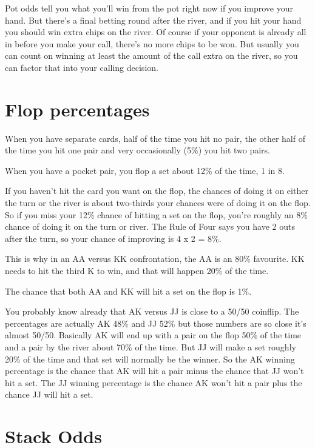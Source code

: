 Pot odds tell you what you'll win from the pot right now if you
improve your hand. But there's a final betting round after the river,
and if you hit your hand you should win extra chips on the river. Of
course if your opponent is already all in before you make your call,
there's no more chips to be won. But usually you can count on winning
at least the amount of the call extra on the river, so you can factor
that into your calling decision.

\section{Flop percentages}

When you have separate cards, half of the time you hit no pair, the
other half of the time you hit one pair and very occasionally (5\%)
you hit two pairs.

When you have a pocket pair, you flop a set about 12\% of the time, 1
in 8.

If you haven't hit the card you want on the flop, the chances of doing
it on either the turn or the river is about two-thirds your
chances were of doing it on the flop. So if you miss your 12\% chance
of hitting a set on the flop, you're roughly an 8\% chance of doing it
on the turn or river. The Rule of Four says you have 2 outs after the
turn, so your chance of improving is 4 x 2 = 8\%.

This is why in an AA versus KK confrontation, the AA is an 80\%
favourite. KK needs to hit the third K to win, and that will happen
20\% of the time.

The chance that both AA and KK will hit a set on the flop is 1\%.

You probably know already that AK versus JJ is close to a 50/50 coinflip.
The percentages are actually AK 48\% and JJ 52\% but those numbers are so
close it's almost 50/50. Basically AK will end up with a pair on the
flop 50\% of the time and a pair by the river about 70\% of the
time. But JJ will make a set roughly 20\% of the time and that set
will normally be the winner. So the AK winning percentage is the
chance that AK will hit a pair minus the chance that JJ won't hit a
set. The JJ winning percentage is the chance AK won't hit a pair plus
the chance JJ will hit a set.

\section{Stack Odds}

